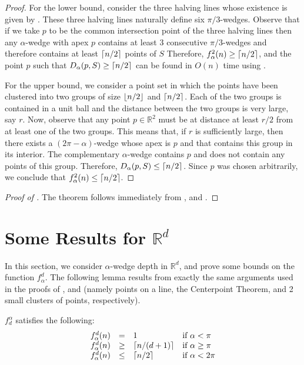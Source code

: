 \documentclass{dmtcs}
\newcommand{\R}{\mathbb{R}}
\begin{document}
\begin{proof}
For the lower bound, consider the three halving lines whose existence
is given by .  These three halving lines
naturally define six $\pi/3$-wedges.  Observe that if we take $p$ to
be the common intersection point of the three halving lines then any
$\alpha$-wedge with apex $p$ contains at least 3 consecutive
$\pi/3$-wedges and therefore contains at least $\left\lceil n/2 \right\rceil$ points of
$S$ Therefore, $f^2_\alpha(n)\ge \left\lceil n/2 \right\rceil$, and the point $p$ such
that $D_\alpha(p,S)\ge \left\lceil n/2 \right\rceil$ can be found in $O(n)$ time using
.
 
For the upper bound, we consider a point set in which the points have
been clustered into two groups of size $\left\lfloor n/2 \right\rfloor$ and $\left\lceil n/2 \right\rceil$.
Each of the two groups is contained in a unit ball and the distance
between the two groups is very large, say $r$.  Now, observe that any
point $p\in\R^2$ must be at distance at least $r/2$ from at
least one of the two groups.  This means that, if $r$ is sufficiently
large, then there exists a $(2\pi-\alpha)$-wedge whose apex is $p$ and
that contains this group in its interior.  The complementary
$\alpha$-wedge contains $p$ and does not contain any points of this
group.  Therefore, $D_\alpha(p,S)\le \left\lceil n/2 \right\rceil$.  Since $p$ was
chosen arbitrarily, we conclude that $f^2_\alpha(n)\le \left\lceil n/2 \right\rceil$.
\end{proof}

\begin{proof}[Proof of ] 
The theorem follows immediately from , 
and .
\end{proof}

\section{Some Results for $\R^d$}

In this section, we consider $\alpha$-wedge depth in $\R^d$,
and prove  some bounds on the function $f^d_\alpha$.  The following
lemma results from exactly the same arguments used in the proofs of
,  and  (namely points on a line, the
Centerpoint Theorem, and 2 small clusters of points, respectively).

\begin{lem}
$f^\alpha_d$ satisfies the following:
\[\begin{array}{lcll}
  f^d_\alpha(n) & = & 1 & \mbox{if $\alpha < \pi$} \\
  f^d_\alpha(n) & \ge & \left\lceil n/(d+1) \right\rceil & \mbox{if $\alpha \ge \pi$} \\
  f^d_\alpha(n) & \le & \left\lceil n/2 \right\rceil & \mbox{if $\alpha < 2\pi$} \\
\end{array}\]
\end{lem}
\end{document}
